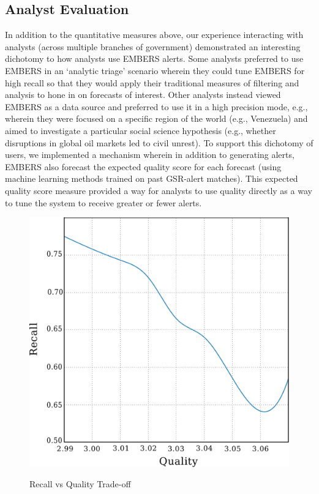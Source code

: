 
\subsection{Analyst Evaluation}
In addition to the quantitative measures above, our experience interacting with analysts (across multiple
branches of government) demonstrated
an interesting dichotomy to how analysts use EMBERS alerts. Some analysts preferred to use EMBERS in an
`analytic triage' scenario wherein they could tune EMBERS for high recall so that they would apply their
traditional measures of filtering and analysis to hone in on forecasts of interest. Other analysts
instead viewed EMBERS as a data source and preferred to use it in a high precision mode, e.g., wherein they
were focused on a specific region of the world (e.g., Venezuela) and aimed to investigate a particular
social science hypothesis (e.g., whether disruptions in global oil markets led to civil unrest).
To support this dichotomy of users, we implemented a mechanism wherein in addition to generating alerts, EMBERS
also forecast the expected quality score for each forecast (using machine learning methods trained on
past GSR-alert matches). This expected quality score measure provided a way for analysts to use quality
directly as a way to tune the system to receive greater or fewer alerts.

\begin{figure}
\centering
\includegraphics[height=0.2\textheight]{figures/cu/recallVsQS.pdf}
\label{fig:recallvsQS}
\caption{Recall vs Quality Trade-off}
\end{figure}

